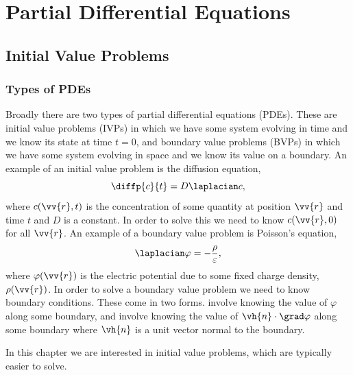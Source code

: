 \documentclass[fleqn]{NotesClass}
\begin{document}
    \part{Partial Differential Equations}
    \chapter{Initial Value Problems}
    \section{Types of PDEs}
    Broadly there are two types of partial differential equations (PDEs).
    These are initial value problems (IVPs) in which we have some system evolving in time and we know its state at time \(t = 0\), and boundary value problems (BVPs) in which we have some system evolving in space and we know its value on a boundary.
    An example of an initial value problem is the diffusion equation,
    \begin{equation}
        \diffp{c}{t} = D\laplacian c,
    \end{equation}
    where \(c(\vv{r}, t)\) is the concentration of some quantity at position \(\vv{r}\) and time \(t\) and \(D\) is a constant.
    In order to solve this we need to know \(c(\vv{r}, 0)\) for all \(\vv{r}\).
    An example of a boundary value problem is Poisson's equation,
    \begin{equation}
        \laplacian\varphi = -\frac{\rho}{\varepsilon},
    \end{equation}
    where \(\varphi(\vv{r})\) is the electric potential due to some fixed charge density, \(\rho(\vv{r})\).
    In order to solve a boundary value problem we need to know boundary conditions.
    These come in two forms.
     involve knowing the value of \(\varphi\) along some boundary, and  involve knowing the value of \(\vh{n}\cdot\grad\varphi\) along some boundary where \(\vh{n}\) is a unit vector normal to the boundary.
    
    In this chapter we are interested in initial value problems, which are typically easier to solve.
    
\end{document}
